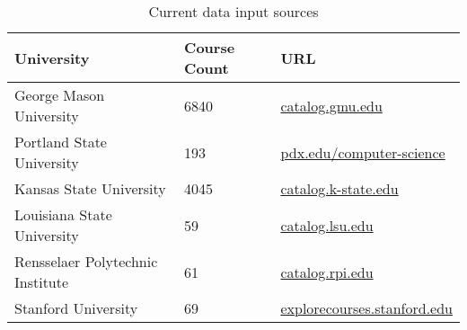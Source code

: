 \begin{table*}[ht]
\centering
\begin{tabular}{lll}
\toprule
University & Course Count & URL \\
\midrule
George Mason University & 6840 & \url{catalog.gmu.edu} \\
Portland State University & 193 & \url{pdx.edu/computer-science} \\
Kansas State University & 4045 & \url{catalog.k-state.edu} \\
Louisiana State University & 59 & \url{catalog.lsu.edu} \\
Rensselaer Polytechnic Institute & 61 & \url{catalog.rpi.edu} \\
Stanford University & 69 & \url{explorecourses.stanford.edu} \\
\bottomrule
\end{tabular}
\caption{Current data input sources\label{table:data-sources}}
\end{table*}


